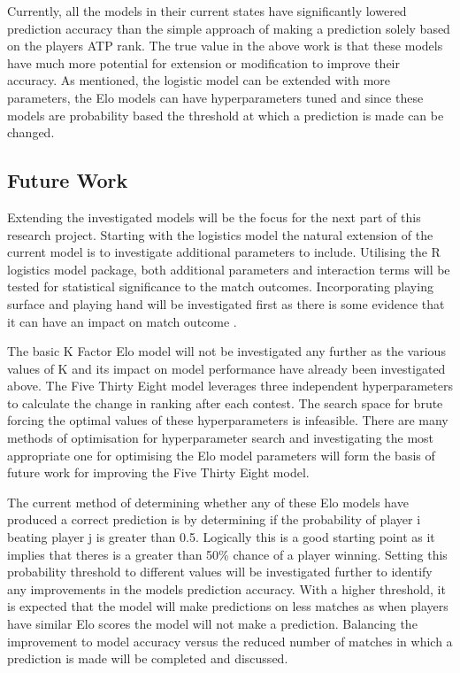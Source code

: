 \documentclass[12pt,a4paper]{article}
\begin{document}
Currently, all the models in their current states have significantly lowered prediction accuracy
than the simple approach of making a prediction solely based on the players ATP rank.
The true value in the above work is that these models have much more potential for extension
or modification to improve their accuracy. As mentioned, the logistic model can be
extended with more parameters, the Elo models can have hyperparameters tuned and since
these models are probability based the threshold at which a prediction is made can be
changed.

\subsection{Future Work}
Extending the investigated models will be the focus for the next part of this research
project. Starting with the logistics model the natural extension of the current model
is to investigate additional parameters to include. Utilising the R logistics model
package, both additional parameters and interaction terms will be tested for statistical
significance to the match outcomes. Incorporating playing surface and playing hand will
be investigated first as there is some evidence that it can have an impact on match
outcome \cite{loffing_left-handedness_2012}.

The basic K Factor Elo model will not be investigated any further as the various values
of K and its impact on model performance have already been investigated above. The Five
Thirty Eight model leverages three independent hyperparameters to calculate the change
in ranking after each contest. The search space for brute forcing the optimal values of
these hyperparameters is infeasible. There are many methods of optimisation for
hyperparameter search \cite{claesen_hyperparameter_2015} and investigating the
most appropriate one for optimising the Elo model parameters will form the basis of
future work for improving the Five Thirty Eight model.

The current method of determining whether any of these Elo models have produced a correct
prediction is by determining if the probability of player i beating player j is greater
than 0.5. Logically this is a good starting point as it implies that theres is a greater
than 50\% chance of a player winning. Setting this probability threshold to different values
will be investigated further to identify any improvements in the models prediction accuracy.
With a higher threshold, it is expected that the model will make predictions on less
matches as when players have similar Elo scores the model will not make a prediction.
Balancing the improvement to model accuracy versus the reduced number of matches in which
a prediction is made will be completed and discussed.
\end{document}
